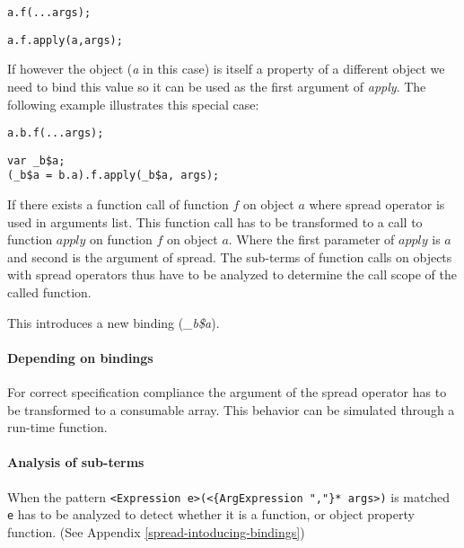 \begin{lstlisting}
a.f(...args);
\end{lstlisting}
\begin{lstlisting}[caption={apply function with correct $this$ scope}]
a.f.apply(a,args);
\end{lstlisting}

If however the object (\textit{a} in this case) is itself a property of a different object we need to bind this value so it can be used as the first argument of \textit{apply}. The following example illustrates this special case:

\begin{minipage}{0.45\textwidth}
\begin{lstlisting}
a.b.f(...args);
\end{lstlisting}
\end{minipage}
\hfill
\begin{minipage}{0.45\textwidth}
\begin{lstlisting}
var _b$a;
(_b$a = b.a).f.apply(_b$a, args);
\end{lstlisting}
\end{minipage}

If there exists a function call of function $f$ on object $a$ where spread operator is used in arguments list. This function call has to be transformed to a call to function $apply$ on function $f$ on object $a$. Where the first parameter of $apply$ is $a$ and second is the argument of spread. The sub-terms of function calls on objects with spread operators thus have to be analyzed to determine the call scope of the called function.

This introduces a new binding (\textit{\_b\$a}).

\paragraph{Depending on bindings}
For correct specification compliance the argument of the spread operator has to be transformed to a consumable array. This behavior can be simulated through a run-time function.

\paragraph{Analysis of sub-terms} \label{spread-analysis-sub-terms}
When the pattern \lstinline$<Expression e>(<{ArgExpression ","}* args>)$ is matched \lstinline$e$ has to be analyzed to detect whether it is a function, or object property function. (See Appendix \ref{spread-intoducing-bindings})

